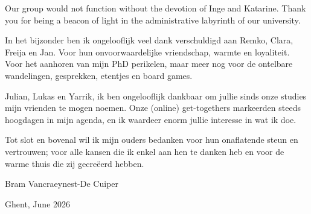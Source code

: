 Our group would not function without the devotion of Inge and Katarine. Thank you for being a beacon of light in the administrative labyrinth of our university.

In het bijzonder ben ik ongelooflijk veel dank verschuldigd aan Remko, Clara, Freija en Jan. Voor hun onvoorwaardelijke vriendschap, warmte en loyaliteit. Voor het aanhoren van mijn PhD perikelen, maar meer nog voor de ontelbare wandelingen, gesprekken, etentjes en board games.

Julian, Lukas en Yarrik, ik ben ongelooflijk dankbaar om jullie sinds onze studies mijn vrienden te mogen noemen. Onze (online) get-togethers markeerden steeds hoogdagen in mijn agenda, en ik waardeer enorm jullie interesse in wat ik doe.

Tot slot en bovenal wil ik mijn ouders bedanken voor hun onaflatende steun en vertrouwen; voor alle kansen die ik enkel aan hen te danken heb en voor de warme thuis die zij gecre\"eerd hebben.

\bigskip\bigskip\hfill Bram Vancraeynest-De Cuiper

\hfill Ghent, June 2026
	